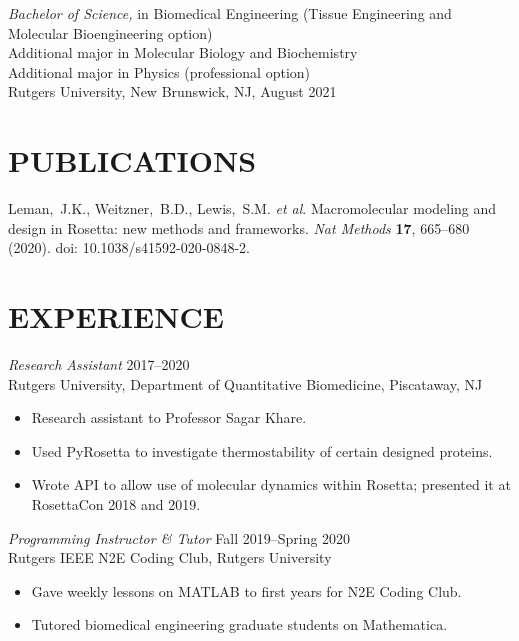 \documentclass{article}
\newcommand{\jobentry}[4]{%
  {\it #1} \hfill #3 \\
  #2

  #4
}
\begin{document}
\vspace{0.8em}

{\it Bachelor of Science,} in Biomedical Engineering (Tissue Engineering and
Molecular Bioengineering option) \\
\hspace*{3em} Additional major in Molecular Biology and Biochemistry \\
\hspace*{3em} Additional major in Physics (professional option) \\
Rutgers University, New Brunswick, NJ, August 2021

\section*{PUBLICATIONS}

Leman,~J.K., Weitzner,~B.D., Lewis,~S.M. \textit{et al}. Macromolecular modeling
and design in Rosetta: new methods and frameworks. \textit{Nat Methods}
\textbf{17}, 665–680 (2020). doi: 10.1038/s41592-020-0848-2.


\section*{EXPERIENCE}

\jobentry{Research Assistant}
  {Rutgers University, Department of Quantitative Biomedicine, Piscataway, NJ}
  {2017--2020}{
    \begin{itemize}
      \item Research assistant to Professor Sagar Khare.
      \item Used PyRosetta to investigate thermostability of certain designed
        proteins.
      \item Wrote API to allow use of molecular dynamics within Rosetta; presented
        it at Rosetta\-Con 2018 and 2019.
    \end{itemize}
  }

\jobentry{Programming Instructor \& Tutor}
  {Rutgers IEEE N2E Coding Club, Rutgers University}
  {Fall 2019--Spring 2020}{
    \begin{itemize}
      \item Gave weekly lessons on MATLAB to first years for N2E Coding Club.
      \item Tutored biomedical engineering graduate students on Mathematica.
    \end{itemize}
  }
\end{document}
